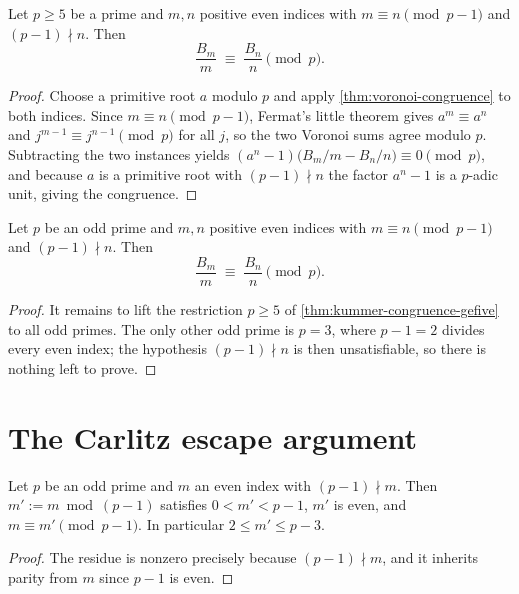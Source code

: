 \begin{theorem}\label{thm:kummer-congruence-gefive}
  \leanok
Let $p \ge 5$ be a prime and $m, n$ positive even indices with
$m \equiv n \pmod{p-1}$ and $(p-1)\nmid n$.  Then
\[
  \frac{B_m}{m} \;\equiv\; \frac{B_n}{n} \pmod{p}.
\]
\end{theorem}
\begin{proof}\leanok
Choose a primitive root $a$ modulo $p$ and apply \cref{thm:voronoi-congruence}
to both indices.  Since $m \equiv n \pmod{p-1}$, Fermat's little theorem gives
$a^m \equiv a^n$ and $j^{m-1}\equiv j^{n-1} \pmod p$ for all $j$, so the two
Voronoi sums agree modulo $p$.  Subtracting the two instances yields
$(a^{n}-1)\bigl(B_m/m - B_n/n\bigr) \equiv 0 \pmod p$, and because $a$ is a
primitive root with $(p-1)\nmid n$ the factor $a^{n}-1$ is a $p$-adic unit,
giving the congruence.
\end{proof}

\begin{theorem}\label{thm:kummer-congruence-full}
  \leanok
Let $p$ be an odd prime and $m, n$ positive even indices with
$m \equiv n \pmod{p-1}$ and $(p-1)\nmid n$.  Then
\[
  \frac{B_m}{m} \;\equiv\; \frac{B_n}{n} \pmod{p}.
\]
\end{theorem}
\begin{proof}\leanok
It remains to lift the restriction $p \ge 5$ of
\cref{thm:kummer-congruence-gefive} to all odd primes.  The only other odd
prime is $p = 3$, where $p - 1 = 2$ divides every even index; the hypothesis
$(p-1)\nmid n$ is then unsatisfiable, so there is nothing left to prove.
\end{proof}

\section{The Carlitz escape argument}

\begin{lemma}\label{lem:positive-residue}
  \leanok
Let $p$ be an odd prime and $m$ an even index with $(p-1)\nmid m$.  Then
$m' := m \bmod (p-1)$ satisfies $0 < m' < p-1$, $m'$ is even, and
$m \equiv m' \pmod{p-1}$.  In particular $2 \le m' \le p-3$.
\end{lemma}
\begin{proof}\leanok
The residue is nonzero precisely because $(p-1)\nmid m$, and it inherits
parity from $m$ since $p-1$ is even.
\end{proof}

